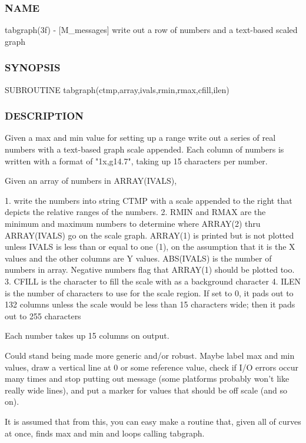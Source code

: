 \subsubsection*{N\+A\+ME}

tabgraph(3f) -\/ \mbox{[}M\+\_\+messages\mbox{]} write out a row of numbers and a text-\/based scaled graph 

\subsubsection*{S\+Y\+N\+O\+P\+S\+IS}

\begin{DoxyVerb}   SUBROUTINE tabgraph(ctmp,array,ivals,rmin,rmax,cfill,ilen)
\end{DoxyVerb}


\subsubsection*{D\+E\+S\+C\+R\+I\+P\+T\+I\+ON}

\begin{DoxyVerb}Given a max and min value for setting up a range
write out a series of real numbers with a text-based graph scale appended.
Each column of numbers is written with a format of "1x,g14.7", taking up
15 characters per number.

Given an array of numbers in ARRAY(IVALS),

  1. write the numbers into string CTMP with a scale appended to the right
     that depicts the relative ranges of the numbers.
  2. RMIN and RMAX are the minimum and maximum numbers to determine
     where ARRAY(2) thru ARRAY(IVALS) go on the scale graph.
     ARRAY(1) is printed but is not plotted unless IVALS is less than or
     equal to one (1), on the assumption that it is the X values and the
     other columns are Y values.
     ABS(IVALS) is the number of numbers in array. Negative numbers flag
     that ARRAY(1) should be plotted too.
  3. CFILL is the character to fill the scale with as a background
     character
  4. ILEN is the number of characters to use for the scale region.
     If set to 0, it pads out to 132 columns unless the scale would be
     less than 15 characters wide; then it pads out to 255 characters

Each number takes up 15 columns on output.

Could stand being made more generic and/or robust. Maybe label max
and min values, draw a vertical line at 0 or some reference value,
check if I/O errors occur many times and stop putting out message
(some platforms probably won't like really wide lines), and put a
marker for values that should be off scale (and so on).

It is assumed that from this, you can easy make a routine that, given
all of curves at once, finds max and min and loops calling tabgraph.
\end{DoxyVerb}


